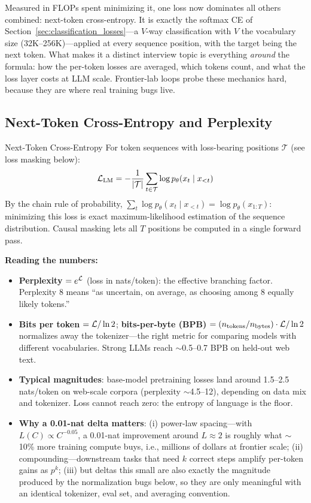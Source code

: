 Measured in FLOPs spent minimizing it, one loss now dominates all others combined: next-token cross-entropy. It is exactly the softmax CE of Section~\ref{sec:classification_losses}---a $V$-way classification with $V$ the vocabulary size (32K--256K)---applied at every sequence position, with the target being the next token. What makes it a distinct interview topic is everything \textit{around} the formula: how the per-token losses are averaged, which tokens count, and what the loss layer costs at LLM scale. Frontier-lab loops probe these mechanics hard, because they are where real training bugs live.

\subsection{Next-Token Cross-Entropy and Perplexity}

\begin{mathresult}{Next-Token Cross-Entropy}
For token sequences with loss-bearing positions $\mathcal{T}$ (see loss masking below):
\begin{equation}
\mathcal{L}_{\text{LM}} = -\frac{1}{|\mathcal{T}|}\sum_{t \in \mathcal{T}} \log p_\theta(x_t \mid x_{<t})
\end{equation}
By the chain rule of probability, $\sum_t \log p_\theta(x_t \mid x_{<t}) = \log p_\theta(x_{1:T})$: minimizing this loss is exact maximum-likelihood estimation of the sequence distribution. Causal masking lets all $T$ positions be computed in a single forward pass.
\end{mathresult}

\textbf{Reading the numbers:}
\begin{itemize}
    \item \textbf{Perplexity} $= e^{\mathcal{L}}$ (loss in nats/token): the effective branching factor. Perplexity 8 means ``as uncertain, on average, as choosing among 8 equally likely tokens.''
    \item \textbf{Bits per token} $= \mathcal{L} / \ln 2$; \textbf{bits-per-byte (BPB)} $= (n_{\text{tokens}} / n_{\text{bytes}}) \cdot \mathcal{L} / \ln 2$ normalizes away the tokenizer---the right metric for comparing models with different vocabularies. Strong LLMs reach $\sim$0.5--0.7 BPB on held-out web text.
    \item \textbf{Typical magnitudes}: base-model pretraining losses land around 1.5--2.5 nats/token on web-scale corpora (perplexity $\sim$4.5--12), depending on data mix and tokenizer. Loss cannot reach zero: the entropy of language is the floor.
    \item \textbf{Why a 0.01-nat delta matters}: (i) power-law spacing---with $L(C) \propto C^{-0.05}$, a 0.01-nat improvement around $L \approx 2$ is roughly what $\sim$10\% more training compute buys, i.e., millions of dollars at frontier scale; (ii) compounding---downstream tasks that need $k$ correct steps amplify per-token gains as $p^k$; (iii) but deltas this small are also exactly the magnitude produced by the normalization bugs below, so they are only meaningful with an identical tokenizer, eval set, and averaging convention.
\end{itemize}

